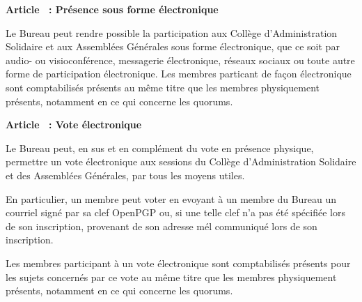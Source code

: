 \documentclass [11pt]{article}
\renewcommand {\section}[1]{\stepcounter {section}%
{\vspace {1em}\noindent\Large \bf Article \thesection\ : #1 \par}}
\begin{document}
\section {Présence sous forme électronique}

Le Bureau peut rendre possible la participation aux Collège d'Administration
Solidaire et aux Assemblées Générales sous forme électronique, que ce soit
par audio- ou visioconférence, messagerie électronique, réseaux sociaux ou
toute autre forme de participation électronique.
Les membres particant de façon électronique sont comptabilisés présents
au même titre que les membres physiquement présents, notamment en ce qui
concerne les quorums.


\section {Vote électronique}

Le Bureau peut, en sus et en complément du vote en présence physique,
permettre un vote électronique aux sessions du Collège d'Administration
Solidaire et des Assemblées Générales, par tous les moyens utiles.

En particulier, un membre peut voter en evoyant à un membre du Bureau un
courriel signé par sa clef OpenPGP ou, si une telle clef n'a pas été
spécifiée lors de son inscription, provenant de son adresse mél communiqué
lors de son inscription.

Les membres participant à un vote électronique sont comptabilisés présents
pour les sujets concernés par ce vote au même titre que les membres
physiquement présents, notamment en ce qui concerne les quorums.
\end{document}
